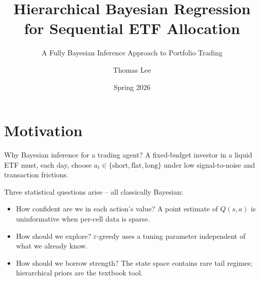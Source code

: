 \documentclass[10pt,aspectratio=169]{beamer}
\title{Hierarchical Bayesian Regression for Sequential ETF Allocation}
\subtitle{A Fully Bayesian Inference Approach to Portfolio Trading}
\author{Thomas Lee}
\institute{STAT 238 -- Graduate Bayesian Statistics \\ UC Berkeley}
\date{Spring 2026}
\begin{document}
\maketitle

\section{Motivation}

\begin{frame}{Why Bayesian inference for a trading agent?}
A fixed-budget investor in a liquid ETF must, each day, choose
$a_t \in \{\text{short}, \text{flat}, \text{long}\}$ under
low signal-to-noise and transaction frictions.

\medskip
Three statistical questions arise -- all classically Bayesian:
\begin{itemize}
  \item \alert{How confident are we in each action's value?} A point
        estimate of $Q(s,a)$ is uninformative when per-cell data is
        sparse.
  \item \alert{How should we explore?} $\varepsilon$-greedy uses a
        tuning parameter independent of what we already know.
  \item \alert{How should we borrow strength?} The state space contains
        rare tail regimes; hierarchical priors are the textbook tool.
\end{itemize}
\end{frame}
\end{document}
